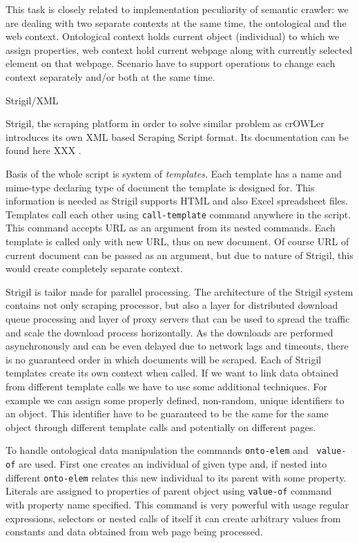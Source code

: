 This task is closely related to implementation peculiarity of semantic crawler:
we are dealing with two separate contexts at the same time, the ontological and
the web context. Ontological context holds current object (individual) to which
we assign properties, web context hold current webpage along with currently
selected element on that webpage. Scenario have to support operations to change
each context separately and/or both at the same time. 



\secc Strigil/XML

Strigil, the scraping platform in order to solve similar problem as crOWLer
introduces its own XML based Scraping Script format. Its documentation can be
found here XXX
. 

Basis of the whole script is system of {\em templates}. Each template has a name
and mime-type declaring type of document the template is designed for. This
information is needed as Strigil supports HTML and also Excel spreadsheet
files. Templates call each other using {\tt call-template} command anywhere in
the script. This command accepts URL as an argument from its nested commands.
Each template is called only with new URL, thus on new document. Of course URL
of current document can be passed as an argument, but due to nature of Strigil,
this would create completely separate context. 

Strigil is tailor made for parallel processing. The architecture of the Strigil
system contains not only scraping processor, but also a layer for distributed
download queue processing and layer of proxy servers that can be used to spread
the traffic and scale the download process horizontally. As the downloads are
performed asynchronously and can be even delayed due to network lags and
timeouts, there is no guaranteed order in which documents will be scraped.
Each of Strigil templates create its own context when called. If we want to
link data obtained from different template calls we have to use some additional
techniques. For example we can assign some properly defined, non-random, unique
identifiers to an object. This identifier have to be guaranteed to be the same
for the same object through different template calls and potentially on
different pages. 

To handle ontological data manipulation the commands {\tt onto-elem} and {\tt
value-of} are used. First one creates an individual of given type and, if
nested into different {\tt onto-elem} relates this new individual to its
parent with some property. Literals are assigned to properties of parent object
using {\tt value-of} command with property name specified. This command is very
powerful with usage regular expressions, selectors or nested calls of itself it
can create arbitrary values from constants and data obtained from web page
being processed. 

